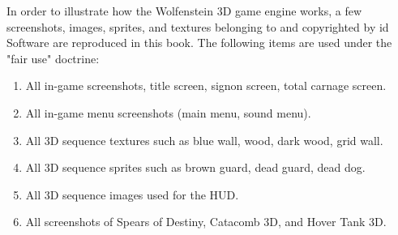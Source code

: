 In order to illustrate how the Wolfenstein 3D game engine works, a few screenshots, images, sprites, and textures belonging to and copyrighted by id Software are reproduced in this book. The following items are used under the "fair use" doctrine:\\
\par
\begin{enumerate}
	\item All in-game screenshots, title screen, signon screen, total carnage screen.
	\item All in-game menu screenshots (main menu, sound menu).
	\item All 3D sequence textures such as blue wall, wood, dark wood, grid wall.
    \item All 3D sequence sprites such as brown guard, dead guard, dead dog.
    \item All 3D sequence images used for the HUD.
    \item All screenshots of Spears of Destiny, Catacomb 3D, and Hover Tank 3D.
\end{enumerate}
